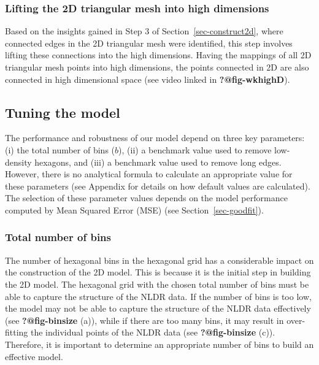 \documentclass[
  12pt]{article}
\begin{document}
\hypertarget{lifting-the-2d-triangular-mesh-into-high-dimensions}{%
\subsubsection{Lifting the 2D triangular mesh into high
dimensions}\label{lifting-the-2d-triangular-mesh-into-high-dimensions}}

Based on the insights gained in Step 3 of Section~\ref{sec-construct2d},
where connected edges in the 2D triangular mesh were identified, this
step involves lifting these connections into the high dimensions. Having
the mappings of all 2D triangular mesh points into high dimensions, the
points connected in 2D are also connected in high dimensional space (see
video linked in \textbf{?@fig-wkhighD}).

\hypertarget{tuning-the-model}{%
\subsection{Tuning the model}\label{tuning-the-model}}

The performance and robustness of our model depend on three key
parameters: (i) the total number of bins (\(b\)), (ii) a benchmark value
used to remove low-density hexagons, and (iii) a benchmark value used to
remove long edges. However, there is no analytical formula to calculate
an appropriate value for these parameters (see Appendix for details on
how default values are calculated). The selection of these parameter
values depends on the model performance computed by Mean Squared Error
(MSE) (see Section~\ref{sec-goodfit}).

\hypertarget{total-number-of-bins}{%
\subsubsection{Total number of bins}\label{total-number-of-bins}}

The number of hexagonal bins in the hexagonal grid has a considerable
impact on the construction of the 2D model. This is because it is the
initial step in building the 2D model. The hexagonal grid with the
chosen total number of bins must be able to capture the structure of the
NLDR data. If the number of bins is too low, the model may not be able
to capture the structure of the NLDR data effectively (see
\textbf{?@fig-binsize} (a)), while if there are too many bins, it may
result in over-fitting the individual points of the NLDR data (see
\textbf{?@fig-binsize} (c)). Therefore, it is important to determine an
appropriate number of bins to build an effective model.
\end{document}
